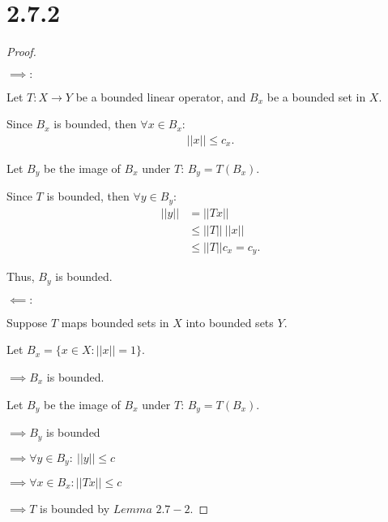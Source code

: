 \documentclass{article}
\begin{document}
\section*{2.7.2}
\begin{proof}
  $ $

  \underline{$\implies: $}
  
  Let $T: X \longrightarrow Y$ be a bounded linear operator, and $B_x$ be a bounded set in $X$.
  \newline

  Since $B_x$ is bounded, then $\forall x \in B_x$:
  \begin{align*}
    ||x|| \leq c_x.
  \end{align*}

  Let $B_y$ be the image of $B_x$ under $T$: $B_y= T(B_x)$.
  \newline

  Since $T$ is bounded, then $\forall y \in B_y$:
  \begin{align*}
    ||y|| &= ||Tx|| \\
    &\leq ||T|| \: ||x|| \\
    &\leq ||T||  c_x = c_y.
  \end{align*}

  Thus, $B_y$ is bounded.
  \newline

  \underline{$\impliedby: $}

  Suppose $T$ maps bounded sets in $X$ into bounded sets $Y$.
  \newline

  Let $B_x = \{x \in X: ||x|| = 1 \}$.
  
  \noindent
  $\implies B_x$ is bounded.
  \newline

  Let $B_y$ be the image of $B_x$ under $T$: $B_y = T(B_x)$.
  
  \noindent
  $\implies B_y$ is bounded
  
  \noindent
  $\implies \forall y \in B_y: \: ||y|| \leq c$

  \noindent
  $\implies \forall x \in B_x: ||Tx|| \leq c$

  \noindent
  $\implies T $ is bounded by $Lemma$  $2.7-2$.

\end{proof}
\end{document}
